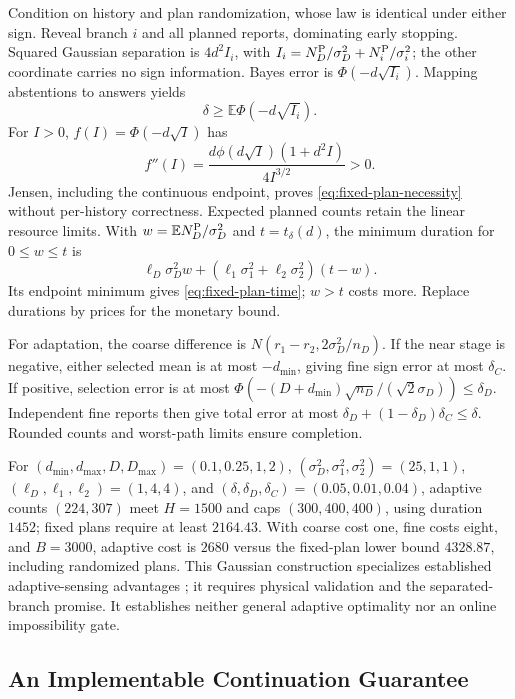\begin{IEEEproof}
Condition on history and plan randomization, whose law is identical under either sign. Reveal branch $i$ and all planned reports, dominating early stopping. Squared Gaussian separation is $4d^2I_i$, with $I_i=N_D^{\rm P}/\sigma_D^2+N_i^{\rm P}/\sigma_i^2$; the other coordinate carries no sign information. Bayes error is $\Phi(-d\sqrt{I_i})$. Mapping abstentions to answers yields
$$\delta\geq\mathbb E\Phi(-d\sqrt{I_i}).$$
For $I>0$, $f(I)=\Phi(-d\sqrt I)$ has
$$f''(I)=\frac{d\phi(d\sqrt I)(1+d^2I)}{4I^{3/2}}>0.$$
Jensen, including the continuous endpoint, proves \eqref{eq:fixed-plan-necessity} without per-history correctness. Expected planned counts retain the linear resource limits. With $w=\mathbb EN_D^{\rm P}/\sigma_D^2$ and $t=t_\delta(d)$, the minimum duration for $0\leq w\leq t$ is
$$\ell_D\sigma_D^2w+(\ell_1\sigma_1^2+\ell_2\sigma_2^2)(t-w).$$
Its endpoint minimum gives \eqref{eq:fixed-plan-time}; $w>t$ costs more. Replace durations by prices for the monetary bound.

For adaptation, the coarse difference is $N(r_1-r_2,2\sigma_D^2/n_D)$. If the near stage is negative, either selected mean is at most $-d_{\min}$, giving fine sign error at most $\delta_C$. If positive, selection error is at most $\Phi(-(D+d_{\min})\sqrt{n_D}/(\sqrt2\sigma_D))\leq\delta_D$. Independent fine reports then give total error at most $\delta_D+(1-\delta_D)\delta_C\leq\delta$. Rounded counts and worst-path limits ensure completion.
\end{IEEEproof}

For
$(d_{\min},d_{\max},D,D_{\max})=(0.1,0.25,1,2)$,
$(\sigma_D^2,\sigma_1^2,\sigma_2^2)=(25,1,1)$,
$(\ell_D,\ell_1,\ell_2)=(1,4,4)$, and
$(\delta,\delta_D,\delta_C)=(0.05,0.01,0.04)$,
adaptive counts $(224,307)$ meet $H=1500$ and caps $(300,400,400)$,
using duration $1452$; fixed plans require at least $2164.43$.
With coarse cost one, fine costs eight, and $B=3000$, adaptive cost
is $2680$ versus the fixed-plan lower bound $4328.87$, including
randomized plans. This Gaussian construction specializes established
adaptive-sensing advantages \cite{nitinawarat2013}; it requires physical
validation and the separated-branch promise. It establishes neither
general adaptive optimality nor an online impossibility gate.

\subsection{An Implementable Continuation Guarantee}
\label{app:continuation-construction}
\label{app:v23selector}


